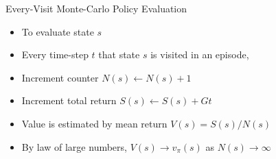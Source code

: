 \bgroup
\begin{frame}{Every-Visit Monte-Carlo Policy Evaluation}
\begin{itemize}
\item To evaluate state $s$
\item Every time-step $t$ that state $s$ is visited in an episode,
\item Increment counter $N(s) \leftarrow N(s) + 1$
\item Increment total return $S(s) \leftarrow S(s) + Gt$
\item Value is estimated by mean return $V(s) = S(s)/N(s)$
\item By law of large numbers, $V(s) \rightarrow v_{\pi}(s)$ as $N(s) \rightarrow \infty$
\end{itemize}
\end{frame}
\egroup